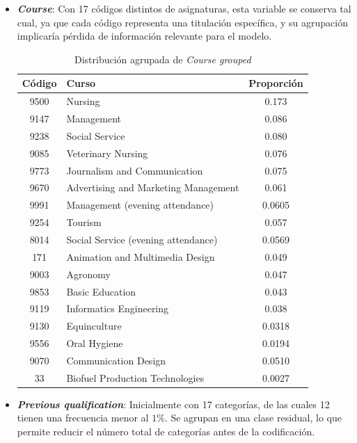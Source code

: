 \documentclass{report}[14pt]
\begin{document}
\begin{itemize}
    \item \textbf{\textit{Course}}: Con 17 códigos distintos de asignaturas, esta variable se conserva tal cual, ya que cada código representa una titulación específica, y su agrupación implicaría pérdida de información relevante para el modelo.
    \begin{table}[H]
    \centering
    \begin{tabular}{|c|l|c|}
        \hline
        \textbf{Código} & \textbf{Curso} & \textbf{Proporción} \\
        \hline
        9500 & Nursing                             & 0.173 \\
        9147 & Management                          & 0.086 \\
        9238 & Social Service                      & 0.080 \\
        9085 & Veterinary Nursing                  & 0.076 \\
        9773 & Journalism and Communication        & 0.075 \\
        9670 & Advertising and Marketing Management & 0.061 \\
        9991 & Management (evening attendance)     & 0.0605 \\
        9254 & Tourism                             & 0.057 \\
        8014 & Social Service (evening attendance) & 0.0569 \\
        171  & Animation and Multimedia Design     & 0.049 \\
        9003 & Agronomy                            & 0.047 \\
        9853 & Basic Education                     & 0.043 \\
        9119 & Informatics Engineering             & 0.038 \\
        9130 & Equinculture                        & 0.0318 \\
        9556 & Oral Hygiene                        &  0.0194\\
        9070 & Communication Design                & 0.0510 \\
        33   & Biofuel Production Technologies     & 0.0027 \\
        \hline
    \end{tabular}
    \caption{Distribución agrupada de \textit{Course grouped}}
    \label{tab:course_grouped}
\end{table}
    \item \textbf{\textit{Previous qualification}}: Inicialmente con 17 categorías, de las cuales 12 tienen una frecuencia menor al $1\%$. Se agrupan en una clase residual, lo que permite reducir el número total de categorías antes de la codificación.

\end{itemize}
\end{document}

